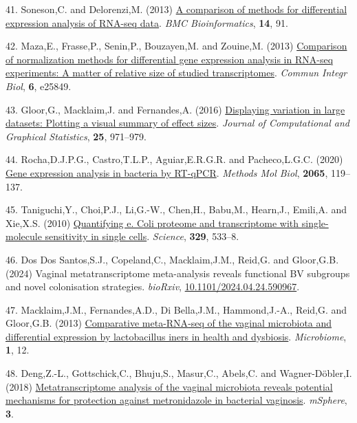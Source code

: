 \documentclass[
]{article}
\newlength{\cslhangindent}
\newenvironment{CSLReferences}[2] %
 {\begin{list}{}{%
  \setlength{\itemindent}{0pt}
  \setlength{\leftmargin}{0pt}
  \setlength{\parsep}{0pt}
  \ifodd #1
   \setlength{\leftmargin}{\cslhangindent}
   \setlength{\itemindent}{-1\cslhangindent}
  \fi
  \setlength{\itemsep}{#2\baselineskip}}}
 {\end{list}}
\begin{document}
\begin{CSLReferences}{1}{1}
41. Soneson,C. and Delorenzi,M. (2013)
\href{https://doi.org/10.1186/1471-2105-14-91}{A comparison of methods
for differential expression analysis of {RNA-seq} data}. \emph{BMC
Bioinformatics}, \textbf{14}, 91.

42. Maza,E., Frasse,P., Senin,P., Bouzayen,M. and Zouine,M. (2013)
\href{https://doi.org/10.4161/cib.25849}{Comparison of normalization
methods for differential gene expression analysis in RNA-seq
experiments: A matter of relative size of studied transcriptomes}.
\emph{Commun Integr Biol}, \textbf{6}, e25849.

43. Gloor,G., Macklaim,J. and Fernandes,A. (2016)
\href{https://doi.org/10.1080/10618600.2015.1131161}{Displaying
variation in large datasets: Plotting a visual summary of effect sizes}.
\emph{Journal of Computational and Graphical Statistics}, \textbf{25},
971--979.

44. Rocha,D.J.P.G., Castro,T.L.P., Aguiar,E.R.G.R. and Pacheco,L.G.C.
(2020) \href{https://doi.org/10.1007/978-1-4939-9833-3_10}{Gene
expression analysis in bacteria by RT-qPCR}. \emph{Methods Mol Biol},
\textbf{2065}, 119--137.

45. Taniguchi,Y., Choi,P.J., Li,G.-W., Chen,H., Babu,M., Hearn,J.,
Emili,A. and Xie,X.S. (2010)
\href{https://doi.org/10.1126/science.1188308}{Quantifying e. Coli
proteome and transcriptome with single-molecule sensitivity in single
cells}. \emph{Science}, \textbf{329}, 533--8.

46. Dos Dos Santos,S.J., Copeland,C., Macklaim,J.M., Reid,G. and
Gloor,G.B. (2024) Vaginal metatranscriptome meta-analysis reveals
functional BV subgroups and novel colonisation strategies.
\emph{bioRxiv},
\href{https://doi.org/10.1101/2024.04.24.590967}{10.1101/2024.04.24.590967}.

47. Macklaim,J.M., Fernandes,A.D., Di Bella,J.M., Hammond,J.-A., Reid,G.
and Gloor,G.B. (2013)
\href{https://doi.org/10.1186/2049-2618-1-12}{Comparative meta-{RNA}-seq
of the vaginal microbiota and differential expression by lactobacillus
iners in health and dysbiosis}. \emph{Microbiome}, \textbf{1}, 12.

48. Deng,Z.-L., Gottschick,C., Bhuju,S., Masur,C., Abels,C. and
Wagner-Döbler,I. (2018)
\href{https://doi.org/10.1128/mSphereDirect.00262-18}{Metatranscriptome
analysis of the vaginal microbiota reveals potential mechanisms for
protection against metronidazole in bacterial vaginosis}.
\emph{mSphere}, \textbf{3}.


\end{CSLReferences}
\end{document}
